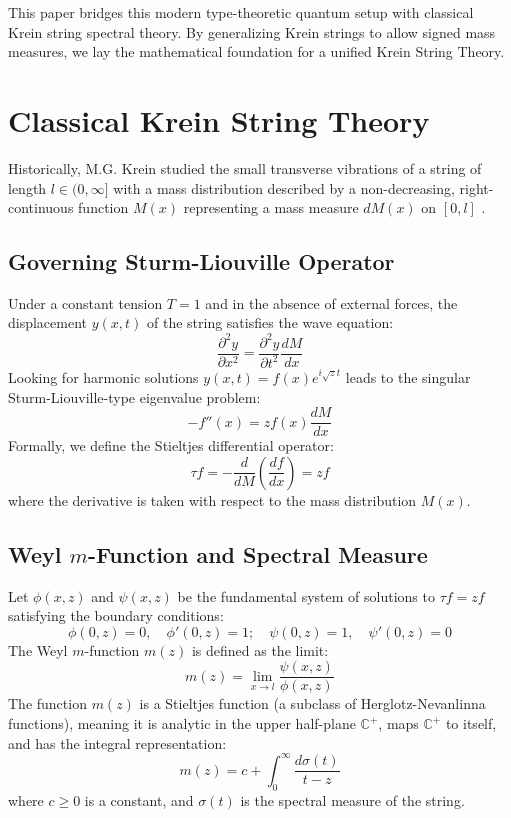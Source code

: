 \documentclass{article}
\begin{document}
This paper bridges this modern type-theoretic quantum setup with classical Krein string spectral theory. By generalizing Krein strings to allow signed mass measures, we lay the mathematical foundation for a unified Krein String Theory.

\section{Classical Krein String Theory}
\label{sec:classical}

Historically, M.G. Krein studied the small transverse vibrations of a string of length $l \in (0, \infty]$ with a mass distribution described by a non-decreasing, right-continuous function $M(x)$ representing a mass measure $dM(x)$ on $[0, l]$ \cite{krein}.

\subsection{Governing Sturm-Liouville Operator}
Under a constant tension $T=1$ and in the absence of external forces, the displacement $y(x, t)$ of the string satisfies the wave equation:
\begin{equation}
    \frac{\partial^2 y}{\partial x^2} = \frac{\partial^2 y}{\partial t^2} \frac{dM}{dx}
\end{equation}
Looking for harmonic solutions $y(x, t) = f(x) e^{i\sqrt{z}t}$ leads to the singular Sturm-Liouville-type eigenvalue problem:
\begin{equation}
    -f''(x) = z f(x) \frac{dM}{dx}
\end{equation}
Formally, we define the Stieltjes differential operator:
\begin{equation}
    \tau f = -\frac{d}{dM} \left( \frac{df}{dx} \right) = z f
\end{equation}
where the derivative is taken with respect to the mass distribution $M(x)$.

\subsection{Weyl $m$-Function and Spectral Measure}
Let $\phi(x, z)$ and $\psi(x, z)$ be the fundamental system of solutions to $\tau f = z f$ satisfying the boundary conditions:
\begin{equation}
    \phi(0, z) = 0, \quad \phi'(0, z) = 1; \quad \psi(0, z) = 1, \quad \psi'(0, z) = 0
\end{equation}
The Weyl $m$-function $m(z)$ is defined as the limit:
\begin{equation}
    m(z) = \lim_{x \to l} \frac{\psi(x, z)}{\phi(x, z)}
\end{equation}
The function $m(z)$ is a Stieltjes function (a subclass of Herglotz-Nevanlinna functions), meaning it is analytic in the upper half-plane $\mathbb{C}^+$, maps $\mathbb{C}^+$ to itself, and has the integral representation:
\begin{equation}
    m(z) = c + \int_0^\infty \frac{d\sigma(t)}{t - z}
\end{equation}
where $c \ge 0$ is a constant, and $\sigma(t)$ is the spectral measure of the string.
\end{document}
